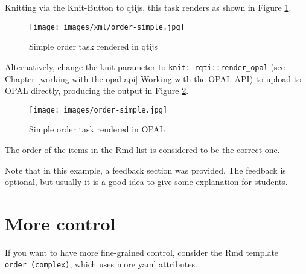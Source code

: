 \documentclass[twoside]{tufte-book}
\begin{document}
Knitting via the Knit-Button to qtijs, this task renders as shown in Figure \ref{order1qtijs}.

\begin{figure}
\centering
\texttt{[image: images/xml/order-simple.jpg]}
\caption{\label{order1qtijs}Simple order task rendered in qtijs}
\end{figure}

\noindent \noindent Alternatively, change the knit parameter to \texttt{knit:\ rqti::render\_opal} (see Chapter \ref{working-with-the-opal-api} \href{api_opal.html}{Working with the OPAL API}) to upload to OPAL directly, producing the output in Figure \ref{order1opal}.

\begin{figure}
\centering
\texttt{[image: images/order-simple.jpg]}
\caption{\label{order1opal}Simple order task rendered in OPAL}
\end{figure}

The order of the items in the Rmd-list is considered to be the correct one.

Note that in this example, a feedback section was provided. The feedback is
optional, but usually it is a good idea to give some explanation for students.

\section{More control}\label{more-control-5}

If you want to have more fine-grained control, consider the Rmd template \texttt{order\ (complex)}, which uses more yaml attributes.
\end{document}
